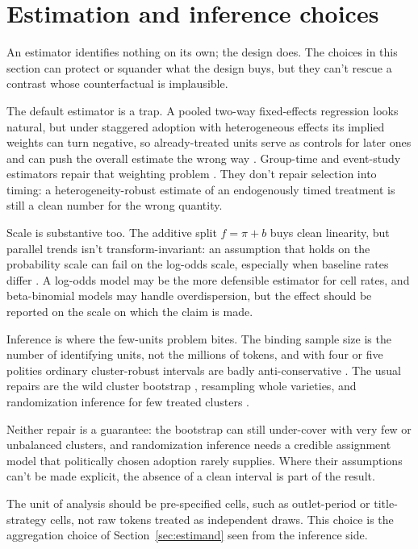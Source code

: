 \section{Estimation and inference choices}
\label{sec:modern}

An estimator identifies nothing on its own; the design does. The choices in this section can protect or squander what the design buys, but they can't rescue a contrast whose counterfactual is implausible.

The default estimator is a trap. A pooled two-way fixed-effects regression looks natural, but under staggered adoption with heterogeneous effects its implied weights can turn negative, so already-treated units serve as controls for later ones and can push the overall estimate the wrong way \citep{GoodmanBacon2021,deChaisemartin2020}. Group-time and event-study estimators repair that weighting problem \citep{CallawaySantAnna2021,SunAbraham2021,BorusyakJaravelSpiess2024}. They don't repair selection into timing: a heterogeneity-robust estimate of an endogenously timed treatment is still a clean number for the wrong quantity.

Scale is substantive too. The additive split $f = \pi + b$ buys clean linearity, but parallel trends isn't transform-invariant: an assumption that holds on the probability scale can fail on the log-odds scale, especially when baseline rates differ \citep{RothSantAnna2023}. A log-odds model may be the more defensible estimator for cell rates, and beta-binomial models may handle overdispersion, but the effect should be reported on the scale on which the claim is made.

Inference is where the few-units problem bites. The binding sample size is the number of identifying units, not the millions of tokens, and with four or five polities ordinary cluster-robust intervals are badly anti-conservative \citep{BertrandDufloMullainathan2004}. The usual repairs are the wild cluster bootstrap \citep{CameronGelbachMiller2008}, resampling whole varieties, and randomization inference for few treated clusters \citep{MacKinnonWebb2020}.

Neither repair is a guarantee: the bootstrap can still under-cover with very few or unbalanced clusters, and randomization inference needs a credible assignment model that politically chosen adoption rarely supplies. Where their assumptions can't be made explicit, the absence of a clean interval is part of the result.

The unit of analysis should be pre-specified cells, such as outlet-period or title-strategy cells, not raw tokens treated as independent draws. This choice is the aggregation choice of Section~\ref{sec:estimand} seen from the inference side.


